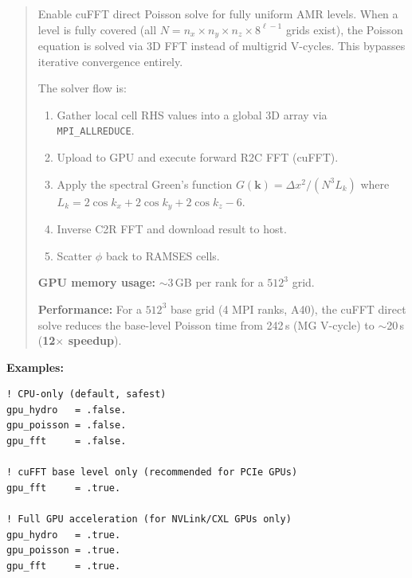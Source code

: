 \begin{quote}
Enable cuFFT direct Poisson solve for fully uniform AMR levels.  When
a level is fully covered (all $N = n_x \times n_y \times n_z \times
8^{\ell-1}$ grids exist), the Poisson equation is solved via 3D FFT
instead of multigrid V-cycles.  This bypasses iterative convergence
entirely.

The solver flow is:
\begin{enumerate}[nosep]
  \item Gather local cell RHS values into a global 3D array via
        \texttt{MPI\_ALLREDUCE}.
  \item Upload to GPU and execute forward R2C FFT (cuFFT).
  \item Apply the spectral Green's function
        $G(\mathbf{k}) = \Delta x^2 / (N^3 L_k)$
        where $L_k = 2\cos k_x + 2\cos k_y + 2\cos k_z - 6$.
  \item Inverse C2R FFT and download result to host.
  \item Scatter $\phi$ back to RAMSES cells.
\end{enumerate}

\textbf{GPU memory usage:} $\sim$3\,GB per rank for a $512^3$ grid.

\textbf{Performance:} For a $512^3$ base grid (4 MPI ranks, A40),
the cuFFT direct solve reduces the base-level Poisson time from
242\,s (MG V-cycle) to $\sim$20\,s (\textbf{12$\times$ speedup}).


\end{quote}

\noindent\textcolor{apidefault}{\textsf{\textbf{Examples:}}}
\begin{lstlisting}
! CPU-only (default, safest)
gpu_hydro   = .false.
gpu_poisson = .false.
gpu_fft     = .false.

! cuFFT base level only (recommended for PCIe GPUs)
gpu_fft     = .true.

! Full GPU acceleration (for NVLink/CXL GPUs only)
gpu_hydro   = .true.
gpu_poisson = .true.
gpu_fft     = .true.
\end{lstlisting}


